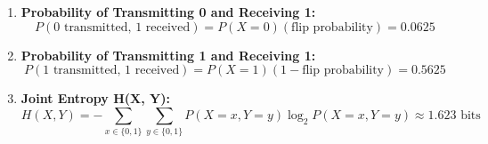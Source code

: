 \documentclass{article}
\begin{document}
\begin{enumerate}
    \item \textbf{Probability of Transmitting 0 and Receiving 1:}
    \[ P(0 \text{ transmitted, } 1 \text{ received}) = P(X=0)(\text{flip probability}) = 0.0625 \]

    \item \textbf{Probability of Transmitting 1 and Receiving 1:}
    \[ P(1 \text{ transmitted, } 1 \text{ received}) = P(X=1)(1 - \text{flip probability}) = 0.5625 \]

    \item \textbf{Joint Entropy H(X, Y):}
    \[ H(X, Y) = -\sum_{x \in \{0,1\}} \sum_{y \in \{0,1\}} P(X=x, Y=y) \log_2 P(X=x, Y=y) \approx 1.623 \text{ bits} \]
\end{enumerate}
\end{document}
